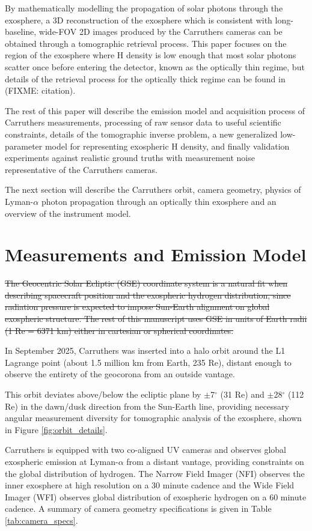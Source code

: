 \documentclass[pdflatex,twocolumn,sn-mathphys-num]{sn-jnl}
\newcommand{\st}[1]{{\color{red}\sout{#1}}}
\begin{document}
By mathematically modelling the propagation of solar photons through the exosphere, a 3D reconstruction of the exosphere which is consistent with long-baseline, wide-FOV 2D images produced by the Carruthers cameras can be obtained through a tomographic retrieval process.
This paper focuses on the region of the exosphere where H density is low enough that most solar photons scatter once before entering the detector, known as the optically thin regime, but details of the retrieval process for the optically thick regime can be found in (FIXME: citation).

The rest of this paper will describe the emission model and acquisition process of Carruthers measurements, processing of raw sensor data to useful scientific constraints, details of the tomographic inverse problem, a new generalized low-parameter model for representing exospheric H density, and finally validation experiments against realistic ground truths with measurement noise representative of the Carruthers cameras.

The next section will describe the Carruthers orbit, camera geometry, physics of Lyman-$\alpha$ photon propagation through an optically thin exosphere and an overview of the instrument model.

\section{Measurements and Emission Model}
\label{sec:measurement_constraints}

  \st{The Geocentric Solar Ecliptic (GSE) coordinate system is a natural fit when describing spacecraft position and the exospheric hydrogen distribution, since radiation pressure is expected to impose Sun-Earth alignment on global exospheric structure.  The rest of this manuscript uses GSE in units of Earth radii (1 Re = 6371 km) either in cartesian or spherical coordinates.}

  In September 2025, Carruthers was inserted into a halo orbit around the L1 Lagrange point (about 1.5 million km from Earth, 235 Re), distant enough to observe the entirety of the geocorona from an outside vantage.

  This orbit deviates above/below the ecliptic plane by $\pm$7$^\circ$ (31 Re) and $\pm$28$^\circ$ (112 Re) in the dawn/dusk direction from the Sun-Earth line, providing necessary angular measurement diversity for tomographic analysis of the exosphere, shown in Figure \ref{fig:orbit_details}.

Carruthers is equipped with two co-aligned UV cameras and observes global exospheric emission at Lyman-$\alpha$ from a distant vantage, providing constraints on the global distribution of hydrogen.
The Narrow Field Imager (NFI) observes the inner exosphere at high resolution on a 30 minute cadence and the Wide Field Imager (WFI) observes global distribution of exospheric hydrogen on a 60 minute cadence.
  A summary of camera geometry specifications is given in Table \ref{tab:camera_specs}.
\end{document}
